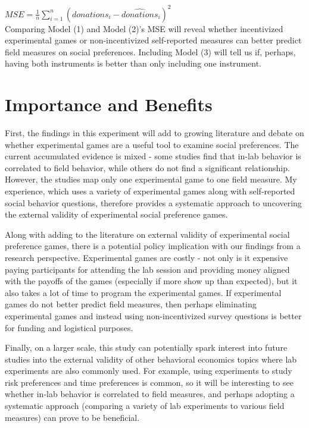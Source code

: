 \documentclass{article}
\begin{document}
{\( MSE = \frac{1}{n}\sum_{i=1}^{n}(donations_{i}-\hat{donations}_{i})^{2} \) \\


Comparing Model (1) and Model (2)\rq s MSE will reveal whether incentivized experimental games or non-incentivized self-reported measures can better predict field measures on social preferences. Including Model (3) will tell us if, perhaps, having both instruments is better than only including one instrument.


\section{Importance and Benefits}

First, the findings in this experiment will add to growing literature and debate on whether experimental games are a useful tool to examine social preferences. The current accumulated evidence is mixed - some studies find that in-lab behavior is correlated to field behavior, while others do not find a significant relationship. However, the studies map only one experimental game to one field measure. My experience, which uses a variety of experimental games along with self-reported social behavior questions, therefore provides a systematic approach to uncovering the external validity of experimental social preference games. 

Along with adding to the literature on external validity of experimental social preference games, there is a potential policy implication with our findings from a research perspective. Experimental games are costly - not only is it expensive paying participants for attending the lab session and providing money aligned with the payoffs of the games (especially if more show up than expected), but it also takes a lot of time to program the experimental games. If experimental games do not better predict field measures, then perhaps eliminating experimental games and instead using non-incentivized survey questions is better for funding and logistical purposes. 

Finally, on a larger scale, this study can potentially spark interest into future studies into the external validity of other behavioral economics topics where lab experiments are also commonly used. For example, using experiments to study risk preferences and time preferences is common, so it will be interesting to see whether in-lab behavior is correlated to field measures, and perhaps adopting a systematic approach (comparing a variety of lab experiments to various field measures) can prove to be beneficial.
 \newpage
\begin{thebibliography}{9}


\end{thebibliography}}
\end{document}
